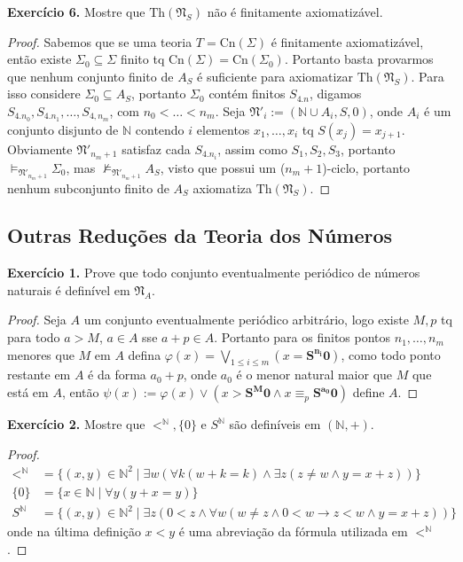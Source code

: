 \documentclass[11pt]{article}
\newcommand{\mf}[1]{\mathfrak{#1}}
\newcommand{\mbb}[1]{\mathbb{#1}}
\newcommand{\subs}[2]{
    \setcounter{subsection}{#1 - 1}
    \subsection{#2}
    }
\begin{document}
\begin{shaded}
\textbf{Exercício 6.} Mostre que $\text{Th}(\mf{N}_S)$ não é finitamente axiomatizável.
\end{shaded}

\begin{proof}
    Sabemos que se uma teoria $T=\text{Cn}(\Sigma)$ é finitamente axiomatizável, então existe $\Sigma_0\subseteq\Sigma$ finito tq $\text{Cn}(\Sigma)=\text{Cn}(\Sigma_0)$. Portanto basta provarmos que nenhum conjunto finito de $A_S$ é suficiente para axiomatizar $\text{Th}(\mf{N}_S)$. Para isso considere $\Sigma_0\subseteq A_S$, portanto $\Sigma_0$ contém finitos $S_{4.n}$, digamos $S_{4.n_0},S_{4.n_1},\dots,S_{4,n_m}$, com $n_0<\dots<n_m$. Seja $\mf{N}'_i:=(\mbb{N}\cup A_i,S,0)$, onde $A_i$ é um conjunto disjunto de $\mbb{N}$ contendo $i$ elementos $x_1,\dots,x_i$ tq $S(x_j)=x_{j+1}$. Obviamente $\mf{N}'_{n_m+1}$ satisfaz cada $S_{4.n_i}$, assim como $S_1,S_2,S_3$, portanto $\vDash_{\mf{N}'_{n_m+1}}\Sigma_0$, mas $\nvDash_{\mf{N}'_{n_m+1}}A_S$, visto que possui um ($n_m+1$)-ciclo, portanto nenhum subconjunto finito de $A_S$ axiomatiza $\text{Th}(\mf{N}_S)$.
\end{proof}

\subs{2}{Outras Reduções da Teoria dos Números}

\begin{shaded}
\textbf{Exercício 1.} Prove que todo conjunto eventualmente periódico de números naturais é definível em $\mf{N}_A$.
\end{shaded}

\begin{proof}
    Seja $A$ um conjunto eventualmente periódico arbitrário, logo existe $M,p$ tq para todo $a>M$, $a\in A$ sse $a+p\in A$. Portanto para os finitos pontos $n_1,\dots,n_m$ menores que $M$ em $A$ defina $\varphi(x)=\bigvee_{1\leq i\leq m}(x=\mathbf{S^{n_i}0})$, como todo ponto restante em $A$ é da forma $a_0+p$, onde $a_0$ é o menor natural maior que $M$ que está em $A$, então $\psi(x):=\varphi(x)\vee (x>\mathbf{S^M0}\wedge x\equiv_p \mathbf{S^{a_0}0})$ define $A$.
\end{proof}

\begin{shaded}
\textbf{Exercício 2.}  Mostre que $<^\mbb{N},\{0\}$ e $S^\mbb{N}$ são definíveis em $(\mbb{N},+)$.
\end{shaded}

\begin{proof}
    \begin{align*}
        <^\mbb{N} & = \{(x,y)\in\mbb{N}^2\mid \exists w(\forall k(w+k=k)\wedge\exists z(z\neq w\wedge y=x+z))\}\\
        \{0\} & = \{x\in\mbb{N}\mid \forall y(y+x=y)\}\\
        S^\mbb{N} & = \{(x,y)\in\mbb{N}^2\mid \exists z(0<z\wedge\forall w(w\neq z\wedge 0<w\to z<w \wedge y=x+z))\}
    \end{align*}
    onde na última definição $x<y$ é uma abreviação da fórmula utilizada em $<^\mbb{N}$.
\end{proof}
\end{document}
